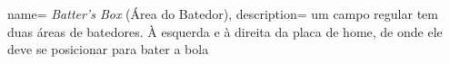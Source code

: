 %
%
{
	name= \textit{Batter's Box} (Área do Batedor),}
{
	description= {um campo regular tem duas áreas de batedores. À esquerda e à direita da placa de home, de onde ele deve se posicionar para bater a bola}
}

